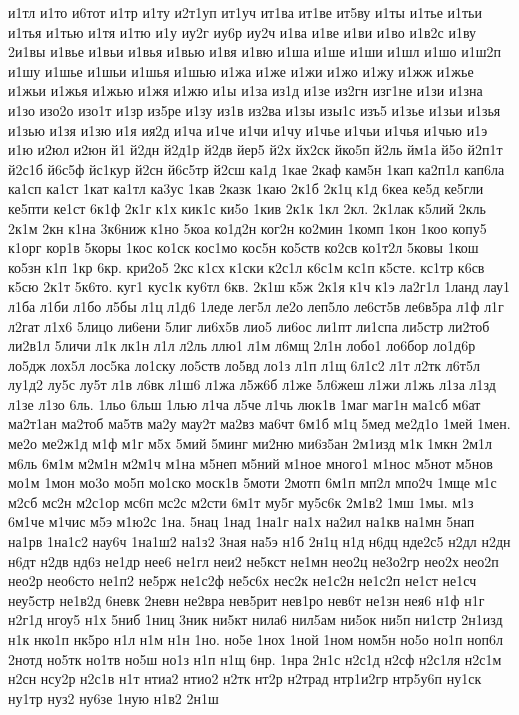 {и1тл
и1то
и6тот
и1тр
и1ту
и2т1уп
ит1уч
ит1ва
ит1ве
ит5ву
и1ты
и1тье
и1тьи
и1тья
и1тью
и1тя
и1тю
и1у
иу2г
иу6р
иу2ч
и1ва
и1ве
и1ви
и1во
и1в2с
и1ву
2и1вы
и1вье
и1вьи
и1вья
и1вью
и1вя
и1вю
и1ша
и1ше
и1ши
и1шл
и1шо
и1ш2п
и1шу
и1шье
и1шьи
и1шья
и1шью
и1жа
и1же
и1жи
и1жо
и1жу
и1жж
и1жье
и1жьи
и1жья
и1жью
и1жя
и1жю
и1ы
и1за
из1д
и1зе
из2гн
изг1не
и1зи
и1зна
и1зо
изо2о
изо1т
и1зр
из5ре
и1зу
из1в
из2ва
и1зы
изы1с
изъ5
и1зье
и1зьи
и1зья
и1зью
и1зя
и1зю
и1я
ия2д
и1ча
и1че
и1чи
и1чу
и1чье
и1чьи
и1чья
и1чью
и1э
и1ю
и2юл
и2юн
й1
й2дн
й2д1р
й2дв
йер5
й2х
йх2ск
йко5п
й2ль
йм1а
й5о
й2п1т
й2с1б
й6с5ф
йс1кур
й2сн
й6с5тр
й2сш
ка1д
1кае
2каф
кам5н
1кап
ка2п1л
кап6ла
ка1сп
ка1ст
1кат
ка1тл
ка3ус
1кав
2казк
1каю
2к1б
2к1ц
к1д
6кеа
ке5д
ке5гли
ке5пти
ке1ст
6к1ф
2к1г
к1х
кик1с
ки5о
1кив
2к1к
1кл
2кл.
2к1лак
к5лий
2кль
2к1м
2кн
к1на
3к6ниж
к1но
5коа
ко1д2н
ког2н
ко2мин
1комп
1кон
1коо
копу5
к1орг
кор1в
5коры
1кос
ко1ск
кос1мо
кос5н
ко5ств
ко2св
ко1т2л
5ковы
1кош
ко5зн
к1п
1кр
6кр.
кри2о5
2кс
к1сх
к1ски
к2с1л
к6с1м
кс1п
к5сте.
кс1тр
к6св
к5сю
2к1т
5к6то.
куг1
кус1к
ку6тл
6кв.
2к1ш
к5ж
2к1я
к1ч
к1э
ла2г1л
1ланд
лау1
л1ба
л1би
л1бо
л5бы
л1ц
л1д6
1леде
лег5л
ле2о
леп5ло
ле6ст5в
ле6в5ра
л1ф
л1г
л2гат
л1х6
5лицо
ли6ени
5лиг
ли6х5в
лио5
ли6ос
ли1пт
ли1спа
ли5стр
ли2тоб
ли2в1л
5личи
л1к
лк1н
л1л
л2ль
ллю1
л1м
л6мщ
2л1н
лобо1
ло6бор
ло1д6р
ло5дж
лох5л
лос5ка
ло1ску
ло5ств
ло5вд
ло1з
л1п
л1щ
6л1с2
л1т
л2тк
л6т5л
лу1д2
лу5с
лу5т
л1в
л6вк
л1ш6
л1жа
л5ж6б
л1же
5л6жеш
л1жи
л1жь
л1за
л1зд
л1зе
л1зо
6ль.
1льо
6льш
1лью
л1ча
л5че
л1чь
люк1в
1маг
маг1н
ма1сб
м6ат
ма2т1ан
ма2тоб
ма5тв
ма2у
мау2т
ма2вз
ма6чт
6м1б
м1ц
5мед
ме2д1о
1мей
1мен.
ме2о
ме2ж1д
м1ф
м1г
м5х
5мий
5минг
ми2ню
ми6з5ан
2м1изд
м1к
1мкн
2м1л
м6ль
6м1м
м2м1н
м2м1ч
м1на
м5неп
м5ний
м1ное
много1
м1нос
м5нот
м5нов
мо1м
1мон
мо3о
мо5п
мо1ско
моск1в
5моти
2мотп
6м1п
мп2л
мпо2ч
1мще
м1с
м2сб
мс2н
м2с1ор
мс6п
мс2с
м2сти
6м1т
му5г
му5с6к
2м1в2
1мш
1мы.
м1з
6м1че
м1чис
м5э
м1ю2с
1на.
5нац
1над
1на1г
на1х
на2ил
на1кв
на1мн
5нап
на1рв
1на1с2
нау6ч
1на1ш2
на1з2
3ная
на5э
н1б
2н1ц
н1д
н6дц
нде2с5
н2дл
н2дн
н6дт
н2дв
нд6з
не1др
нее6
не1гл
неи2
не5кст
не1мн
нео2ц
не3о2гр
нео2х
нео2п
нео2р
нео6сто
не1п2
не5рж
не1с2ф
не5с6х
нес2к
не1с2н
не1с2п
не1ст
не1сч
неу5стр
не1в2д
6невк
2невн
не2вра
нев5рит
нев1ро
нев6т
не1зн
нея6
н1ф
н1г
н2г1д
нгоу5
н1х
5ниб
1ниц
3ник
ни5кт
нила6
нил5ам
ни5ок
ни5п
ни1стр
2н1изд
н1к
нко1п
нк5ро
н1л
н1м
н1н
1но.
но5е
1нох
1ной
1ном
ном5н
но5о
но1п
ноп6л
2нотд
но5тк
но1тв
но5ш
но1з
н1п
н1щ
6нр.
1нра
2н1с
н2с1д
н2сф
н2с1ля
н2с1м
н2сн
нсу2р
н2с1в
н1т
нтиа2
нтио2
н2тк
нт2р
н2трад
нтр1и2гр
нтр5у6п
ну1ск
ну1тр
нуз2
ну6зе
1ную
н1в2
2н1ш
}
